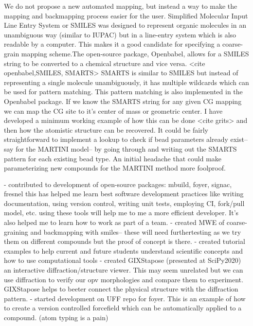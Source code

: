 We do not propose a new automated mapping, but instead a way to make the mapping and backmapping process easier for the user.
Simplified Molecular Input Line Entry System or SMILES \cite{Weininger} was designed to represent organic molecules in an unambiguous way (similar to IUPAC) but in a line-entry system which is also readable by a computer.
This makes it a good candidate for specifying a coarse-grain mapping scheme.The open-source package, Openbabel, allows for a SMILES string to be converted to a chemical structure and vice versa.
<cite openbabel,SMILES, SMARTS> SMARTS is similar to SMILES but instead of representing a single molecule unambiguously, it has multiple wildcards which can be used for pattern matching.
This pattern matching is also implemented in the Openbabel package.
If we know the SMARTS string for any given CG mapping we can map the CG site to it's center of mass or geometric center.
I have developed a minimum working example of how this can be done <cite grits> and then how the atomistic structure can be recovered.
It could be fairly straightforward to implement a lookup to check if bead parameters already exist--say for the MARTINI model-- by going through and writing out the SMARTS pattern for each existing bead type.
An initial headache that could make parameterizing new compounds for the MARTINI method more foolproof.

- contributed to development of open-source packages: mbuild, foyer, signac, fresnel
 this has helped me learn best software development practices like writing documentation, using version control, writing unit tests, employing CI, fork/pull model, etc.
using these tools will help me to me a more efficient developer.
It's also helped me to learn how to work as part of a team.
 - created MWE of coarse-graining and backmapping with smiles-- these will need furthertesting as we try them on different compounds but the proof of concept is there.
 - created tutorial examples to help current and future students understand scientific concepts and how to use computational tools
 - created GIXStapose (presented at SciPy2020) an interactive diffraction/structure viewer.
This may seem unrelated but we can use diffraction to verify our opv morphologies and compare them to experiment.
GIXStapose helps to beeter connect the physical structure with the diffraction pattern.
- started development on UFF repo for foyer.
This is an example of how to create a version controlled forcefield which can be automatically applied to a compound.
(atom typing is a pain)


